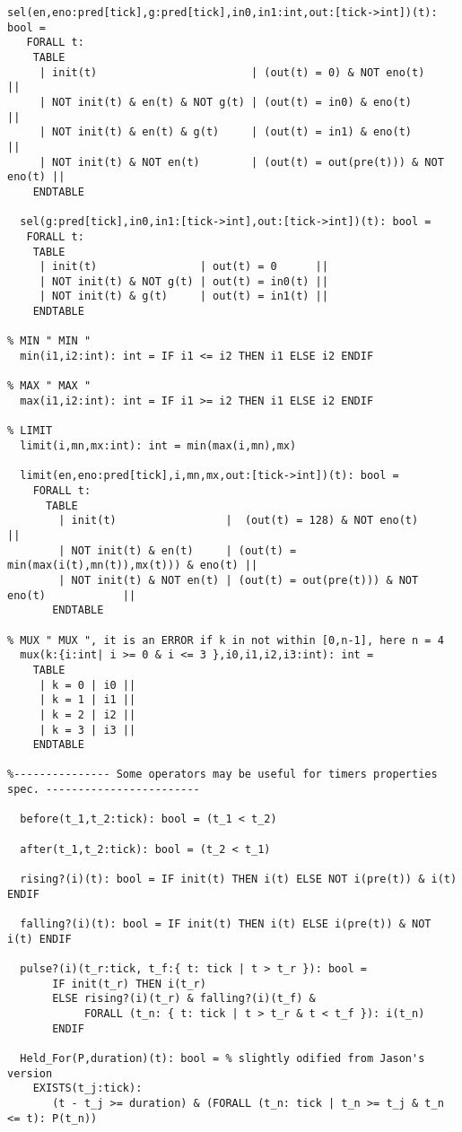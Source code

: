 \begin{singlespace}
\begin{lstlisting}[tabsize=2, language=PVS]
  sel(en,eno:pred[tick],g:pred[tick],in0,in1:int,out:[tick->int])(t): bool = 
   FORALL t:
    TABLE
     | init(t)                        | (out(t) = 0) & NOT eno(t)           || 
     | NOT init(t) & en(t) & NOT g(t) | (out(t) = in0) & eno(t)             ||
     | NOT init(t) & en(t) & g(t)     | (out(t) = in1) & eno(t)             ||
     | NOT init(t) & NOT en(t)        | (out(t) = out(pre(t))) & NOT eno(t) ||
    ENDTABLE

  sel(g:pred[tick],in0,in1:[tick->int],out:[tick->int])(t): bool = 
   FORALL t:
    TABLE
     | init(t)                | out(t) = 0      || 
     | NOT init(t) & NOT g(t) | out(t) = in0(t) ||
     | NOT init(t) & g(t)     | out(t) = in1(t) ||
    ENDTABLE

% MIN " MIN "
  min(i1,i2:int): int = IF i1 <= i2 THEN i1 ELSE i2 ENDIF

% MAX " MAX "
  max(i1,i2:int): int = IF i1 >= i2 THEN i1 ELSE i2 ENDIF

% LIMIT
  limit(i,mn,mx:int): int = min(max(i,mn),mx)

  limit(en,eno:pred[tick],i,mn,mx,out:[tick->int])(t): bool = 
    FORALL t:
      TABLE
        | init(t)                 |  (out(t) = 128) & NOT eno(t)                   ||
        | NOT init(t) & en(t)     | (out(t) = min(max(i(t),mn(t)),mx(t))) & eno(t) ||
        | NOT init(t) & NOT en(t) | (out(t) = out(pre(t))) & NOT eno(t)            ||
       ENDTABLE

% MUX " MUX ", it is an ERROR if k in not within [0,n-1], here n = 4
  mux(k:{i:int| i >= 0 & i <= 3 },i0,i1,i2,i3:int): int = 
    TABLE
     | k = 0 | i0 ||
     | k = 1 | i1 ||
     | k = 2 | i2 ||
     | k = 3 | i3 ||
    ENDTABLE

%--------------- Some operators may be useful for timers properties spec. ------------------------

  before(t_1,t_2:tick): bool = (t_1 < t_2)

  after(t_1,t_2:tick): bool = (t_2 < t_1)

  rising?(i)(t): bool = IF init(t) THEN i(t) ELSE NOT i(pre(t)) & i(t) ENDIF

  falling?(i)(t): bool = IF init(t) THEN i(t) ELSE i(pre(t)) & NOT i(t) ENDIF

  pulse?(i)(t_r:tick, t_f:{ t: tick | t > t_r }): bool =
       IF init(t_r) THEN i(t_r)
       ELSE rising?(i)(t_r) & falling?(i)(t_f) & 
            FORALL (t_n: { t: tick | t > t_r & t < t_f }): i(t_n)
       ENDIF

  Held_For(P,duration)(t): bool = % slightly odified from Jason's version
    EXISTS(t_j:tick):
       (t - t_j >= duration) & (FORALL (t_n: tick | t_n >= t_j & t_n <= t): P(t_n))


\end{lstlisting}
\end{singlespace}
